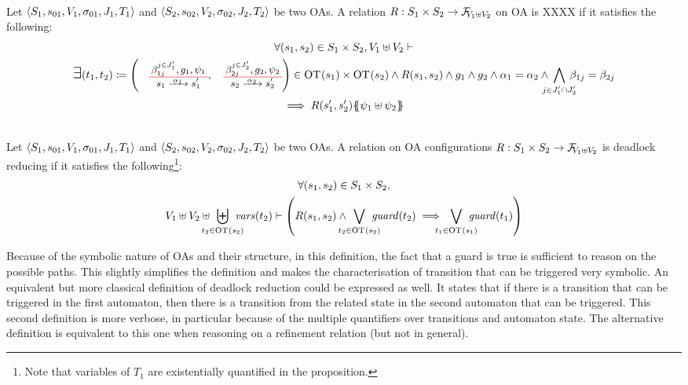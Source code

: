 \documentclass[runningheads]{llncs}
\begin{document}
\begin{definition}[XXX]\label{def:???} \\
Let \(\OAg[1]\) and \(\OAg[2]\) be two OAs.
A relation \(R: S_1 \times S_2 \to \rformulas[V_1 \uplus V_2]\) on OA   is XXXX if  it satisfies the following:
\begin{multline*}
\forall \mpar{s_1, s_2} \in S_1 \times S_2,  V_1 \uplus V_2\vdash \\ \bigsymb{\exists} \mpar{t_1, t_2} \defobject \mpar{\OTx{1}{}{1}{1}, \OTx{2}{}{2}{2}} \in \fOT{s_1} \times \fOT{s_2} \wedge R\mpar{s_1, s_2} \wedge 	g_1 \wedge g_2 \wedge \alpha_1 = \alpha_2 \wedge \bigwedge_\subbox{j \in J'_1 \cap J'_2} \beta_{1j} = \beta_{2j}\\ \implies  R\mpar{s'_1, s'_2}\psubst{\psi_1 \uplus \psi_2}\\
\end{multline*}
\end{definition}


\begin{definition}\label{def:dpwd}\\
Let \(\OAg[1]\) and \(\OAg[2]\) be two OAs.
A relation on OA configurations \(R: S_1 \times S_2 \to \rformulas[V_1 \uplus V_2]\) is deadlock reducing if  it satisfies the following\footnote{Note that variables of $T_1$ are existentially quantified in the proposition.}:
\begin{multline*}
 \forall \mpar{s_1, s_2} \in S_1 \times S_2,\\ V_1 \uplus V_2 \uplus \biguplus_\subbox{t_2 \in \fOT{s_2}} \fvars{t_2} \vdash \left(R\mpar{s_1, s_2} \wedge \bigvee_\subbox{t_2 \in \fOT{s_2}} \fguard{t_2} \implies \bigvee_\subbox{t_1 \in \fOT{s_1}} \fguard{t_1} \right)
\end{multline*}
\end{definition}

Because of the symbolic nature of OAs and their structure, in this definition,  the fact that a guard is true is sufficient to reason on the possible paths. This slightly simplifies the definition and makes the characterisation of transition that can be triggered very symbolic. An equivalent but more classical definition of deadlock reduction could be expressed as well. It states that if there is a transition that can be triggered in the first automaton, then there is a transition from the related state in the second automaton that can be triggered. This second definition is more verbose, in particular because of the multiple quantifiers over transitions and automaton state. The alternative definition is equivalent to this one when reasoning on a refinement relation (but not in general).
\end{document}
